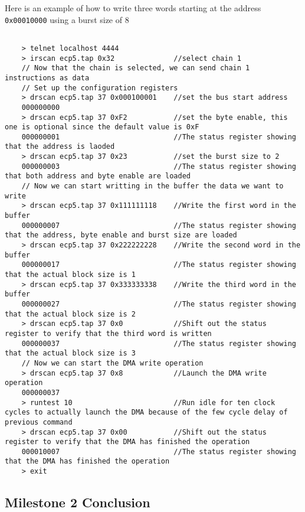 \documentclass[a4paper,11pt,oneside]{report}
\begin{document}
Here is an example of how to write three words starting at the address \texttt{0x00010000} using a burst size of 8

\begin{lstlisting}

    > telnet localhost 4444
    > irscan ecp5.tap 0x32              //select chain 1
    // Now that the chain is selected, we can send chain 1 instructions as data
    // Set up the configuration registers
    > drscan ecp5.tap 37 0x000100001    //set the bus start address
    000000000
    > drscan ecp5.tap 37 0xF2           //set the byte enable, this one is optional since the default value is 0xF
    000000001                           //The status register showing that the address is laoded
    > drscan ecp5.tap 37 0x23           //set the burst size to 2
    000000003                           //The status register showing that both address and byte enable are loaded 
    // Now we can start writting in the buffer the data we want to write
    > drscan ecp5.tap 37 0x111111118    //Write the first word in the buffer
    000000007                           //The status register showing that the address, byte enable and burst size are loaded
    > drscan ecp5.tap 37 0x222222228    //Write the second word in the buffer
    000000017                           //The status register showing that the actual block size is 1
    > drscan ecp5.tap 37 0x333333338    //Write the third word in the buffer
    000000027                           //The status register showing that the actual block size is 2
    > drscan ecp5.tap 37 0x0            //Shift out the status register to verify that the third word is written
    000000037                           //The status register showing that the actual block size is 3
    // Now we can start the DMA write operation
    > drscan ecp5.tap 37 0x8            //Launch the DMA write operation
    000000037                           
    > runtest 10                        //Run idle for ten clock cycles to actually launch the DMA because of the few cycle delay of previous command
    > drscan ecp5.tap 37 0x00           //Shift out the status register to verify that the DMA has finished the operation
    000010007                           //The status register showing that the DMA has finished the operation
    > exit
\end{lstlisting}


\subsection{Milestone 2 Conclusion}
\end{document}
